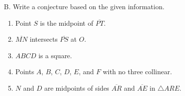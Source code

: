 \vspace*{1ex}

B. Write a conjecture based on the given information. 
\begin{enumerate}[label = \arabic*. ]
\item Point $S$ is the midpoint of $\overline{PT}$. 
\item $\overline{MN}$ intersects $\overline{PS}$ at $O$. 
\item $ABCD$ is a square. 
\item Points $A$, $B$, $C$, $D$, $E$,  and $F$ with no three collinear. 
\item $N$ and $D$ are midpoints of sides $\overline{AR} $ and $\overline{AE} $ in $\triangle ARE$. 
\end{enumerate} 